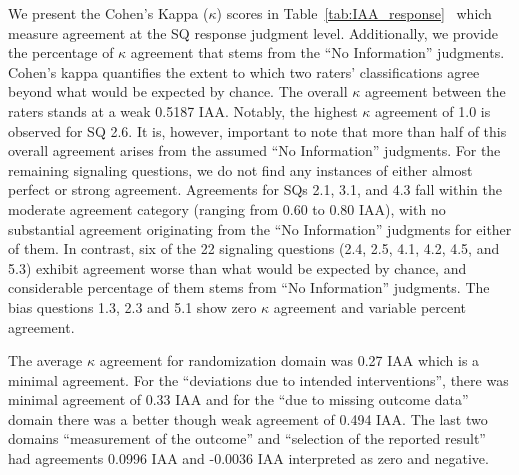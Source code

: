\documentclass[sn-mathphys,Numbered]{sn-jnl}%
\theoremstyle{thmstyleone}%
\theoremstyle{thmstyletwo}%
\theoremstyle{thmstylethree}%
\begin{document}
We present the Cohen's Kappa ($\kappa$) scores in Table~\ref{tab:IAA_response}~\cite{mchugh2012interrater} which measure agreement at the SQ response judgment level.
Additionally, we provide the percentage of $\kappa$ agreement that stems from the ``No Information'' judgments.
Cohen's kappa quantifies the extent to which two raters' classifications agree beyond what would be expected by chance.
The overall $\kappa$ agreement between the raters stands at a weak 0.5187 IAA.
Notably, the highest $\kappa$ agreement of 1.0 is observed for SQ 2.6.
It is, however, important to note that more than half of this overall agreement arises from the assumed ``No Information'' judgments.
For the remaining signaling questions, we do not find any instances of either almost perfect or strong agreement.
Agreements for SQs 2.1, 3.1, and 4.3 fall within the moderate agreement category (ranging from 0.60 to 0.80 IAA), with no substantial agreement originating from the ``No Information'' judgments for either of them.
In contrast, six of the 22 signaling questions (2.4, 2.5, 4.1, 4.2, 4.5, and 5.3) exhibit agreement worse than what would be expected by chance, and considerable percentage of them stems from ``No Information'' judgments.
The bias questions 1.3, 2.3 and 5.1 show zero $\kappa$ agreement and variable percent agreement.

The average $\kappa$ agreement for randomization domain was 0.27 IAA which is a minimal agreement.
For the ``deviations due to intended interventions'', there was minimal agreement of 0.33 IAA and for the ``due to missing outcome data'' domain there was a better though weak agreement of 0.494 IAA.
The last two domains ``measurement of the outcome'' and ``selection of the reported result'' had agreements 0.0996 IAA and -0.0036 IAA interpreted as zero and negative.
\end{document}
